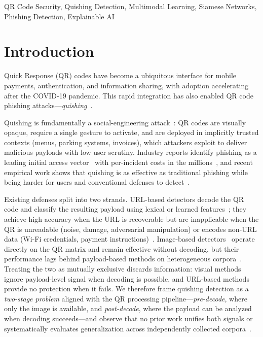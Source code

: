 \documentclass[conference]{IEEEtran}
\begin{document}
\begin{IEEEkeywords}
QR Code Security, Quishing Detection, Multimodal Learning, Siamese Networks, Phishing Detection, Explainable AI
\end{IEEEkeywords}


\section{Introduction}

Quick Response (QR) codes have become a ubiquitous interface for mobile payments, authentication, and information sharing, with adoption accelerating after the COVID-19 pandemic. This rapid integration has also enabled QR code phishing attacks---\textit{quishing}~\cite{sharevski2022phishing}.

Quishing is fundamentally a social-engineering attack~\cite{mitnick2002artdeception, hadnagy2018socialengineering}: QR codes are visually opaque, require a single gesture to activate, and are deployed in implicitly trusted contexts (menus, parking systems, invoices), which attackers exploit to deliver malicious payloads with low user scrutiny. Industry reports identify phishing as a leading initial access vector~\cite{verizon2024dbir} with per-incident costs in the millions~\cite{ibm2024cost}, and recent empirical work shows that quishing is as effective as traditional phishing while being harder for users and conventional defenses to detect~\cite{weinz2025impact, geisler2024hooked}.

Existing defenses split into two strands. URL-based detectors decode the QR code and classify the resulting payload using lexical or learned features~\cite{khalifa2025multiphishnet, nejati2026cic}; they achieve high accuracy when the URL is recoverable but are inapplicable when the QR is unreadable (noise, damage, adversarial manipulation) or encodes non-URL data (Wi-Fi credentials, payment instructions)~\cite{trad2025detecting}. Image-based detectors~\cite{trad2025detecting, wahid2025qris} operate directly on the QR matrix and remain effective without decoding, but their performance lags behind payload-based methods on heterogeneous corpora~\cite{nejati2026cic}. Treating the two as mutually exclusive discards information: visual methods ignore payload-level signal when decoding is possible, and URL-based methods provide no protection when it fails. We therefore frame quishing detection as a \textit{two-stage problem} aligned with the QR processing pipeline---\textit{pre-decode}, where only the image is available, and \textit{post-decode}, where the payload can be analyzed when decoding succeeds---and observe that no prior work unifies both signals or systematically evaluates generalization across independently collected corpora~\cite{nejati2026cic, wahid2026alfa}.
\end{document}
